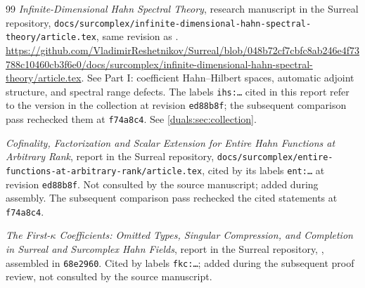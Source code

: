 \documentclass[11pt,letterpaper]{article}
\numberwithin{equation}{section}
\theoremstyle{definition}
\theoremstyle{remark}
\begin{document}
\begin{thebibliography}{99}
\emph{Infinite-Dimensional Hahn Spectral Theory}, research manuscript
in the Surreal repository,
\texttt{docs/surcomplex/infinite-dimensional-hahn-spectral-theory/article.tex},
same revision as \cite{RepoRoot}.
\url{https://github.com/VladimirReshetnikov/Surreal/blob/048b72cf7cbfc8ab246e4f73788c10460cb3f6e0/docs/surcomplex/infinite-dimensional-hahn-spectral-theory/article.tex}.
See Part I: coefficient Hahn--Hilbert spaces, automatic adjoint
structure, and spectral range defects. The labels \texttt{ihs:\dots}
cited in this report refer to the version in the collection at
revision \texttt{ed88b8f}; the subsequent comparison pass rechecked them
at \texttt{f74a8c4}. See \cref{duals:sec:collection}.

\emph{Cofinality, Factorization and Scalar Extension for Entire Hahn
Functions at Arbitrary Rank}, report in the Surreal repository,
\texttt{docs/surcomplex/entire-functions-at-arbitrary-rank/article.tex},
cited by its labels \texttt{ent:\dots} at revision \texttt{ed88b8f}.
Not consulted by the source manuscript; added during assembly. The
subsequent comparison pass rechecked the cited statements at
\texttt{f74a8c4}.

\emph{The First-$\kappa$ Coefficients: Omitted Types, Singular
Compression, and Completion in Surreal and Surcomplex Hahn Fields},
report in the Surreal repository,
, assembled in
\texttt{68e2960}. Cited by labels \texttt{fkc:\dots}; added during the
subsequent proof review, not consulted by the source manuscript.
\end{thebibliography}
\end{document}
